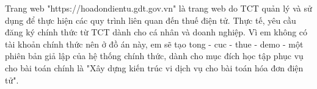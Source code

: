 Trang web "https://hoadondientu.gdt.gov.vn" là trang web do TCT quản lý và sử dụng để thực hiện các quy trình liên quan đến thuế điện tử. Thực tế, yêu cầu đăng ký chính thức từ TCT dành cho cá nhân và doanh nghiệp. Vì em không có tài khoản chính thức nên ở đồ án này, em sẽ tạo tong - cuc - thue - demo - một phiên bản giả lập của hệ thống chính thức, dành cho mục đích học tập phục vụ cho bài toán chính là "Xây dựng kiến trúc vi dịch vụ cho bài toán hóa đơn điện tử".

